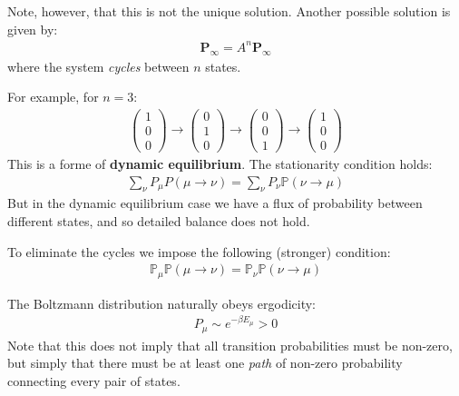 \documentclass[../template.tex]{subfiles}
\begin{document}
\begin{itemize}
    \medskip

    Note, however, that this is not the unique solution. Another possible solution is given by:
    \begin{align*}
        \bm{P}_\infty = A^n \bm{P}_\infty
    \end{align*}
    where the system \textit{cycles} between $n$ states. %
    
    For example, for $n=3$:
    \begin{align*}
        \left(\begin{array}{c}
        1 \\ 
        0 \\ 
        0
        \end{array}\right) \to \left(\begin{array}{c}
        0 \\ 
        1 \\ 
        0
        \end{array}\right) \to \left(\begin{array}{c}
        0 \\ 
        0 \\ 
        1
        \end{array}\right) \to \left(\begin{array}{c}
        1 \\ 
        0 \\ 
        0
        \end{array}\right)
    \end{align*}
    This is a forme of \textbf{dynamic equilibrium}. The stationarity condition holds:
    \begin{align*}
        \sum_\nu P_\mu P(\mu \to \nu) = \sum_\nu P_\nu \mathbb{P}(\nu \to \mu)
    \end{align*} 
    But in the dynamic equilibrium case we have a flux of probability between different states, and so detailed balance does not hold.

    \medskip

    To eliminate the cycles we impose the following (stronger) condition:
    \begin{align}\label{eqn:detailed-balance}
        \mathbb{P}_{\mu} \mathbb{P}(\mu \to \nu) = \mathbb{P}_{\nu} \mathbb{P}(\nu \to \mu)
    \end{align}
\end{itemize}

The Boltzmann distribution naturally obeys ergodicity:
\begin{align*}
    P_{\mu} \sim e^{-\beta E_{\mu}} > 0
\end{align*}
Note that this does not imply that all transition probabilities must be non-zero, but simply that there must be at least one \textit{path} of non-zero probability connecting every pair of states.
\end{document}
